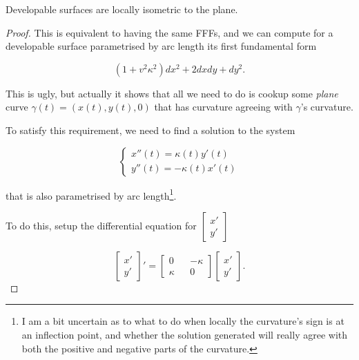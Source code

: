 \documentclass[11pt]{scrartcl}
\begin{document}
\begin{theorem}
Developable surfaces are locally isometric to the plane.

\begin{proof}
    This is equivalent to having the same FFFs, and we can compute for a developable surface parametrised by arc length its first fundamental form %

    \begin{equation}
        (1 + v^2 \kappa^2) dx^2 + 2 dx dy + dy^2.
    \end{equation}

    This is ugly, but actually it shows that all we need to do is cookup some \textit{plane} curve $\hat{\gamma}(t) = (x(t), y(t), 0)$ that has curvature agreeing with $\gamma$'s curvature.

    To satisfy this requirement, we need to find a solution to the system

    \begin{equation}
        \begin{cases}
            x''(t) = \kappa(t) y'(t) \\
            y''(t) = - \kappa(t) x'(t)
        \end{cases}
    \end{equation}

    that is also parametrised by arc length\footnote{I am a bit uncertain as to what to do when locally the curvature's sign is at an inflection point, and whether the solution generated will really agree with both the positive and negative parts of the curvature.}.

    To do this, setup the differential equation for $\begin{bmatrix}
        x' \\
        y'
    \end{bmatrix}$

    \begin{equation}
        \begin{bmatrix}
            x' \\
            y'
        \end{bmatrix}'
        =
        \begin{bmatrix}
            0 && -\kappa \\
            \kappa && 0
        \end{bmatrix}
        \begin{bmatrix}
            x' \\
            y'
        \end{bmatrix}.
    \end{equation}


\end{proof}
\end{theorem}
\end{document}
